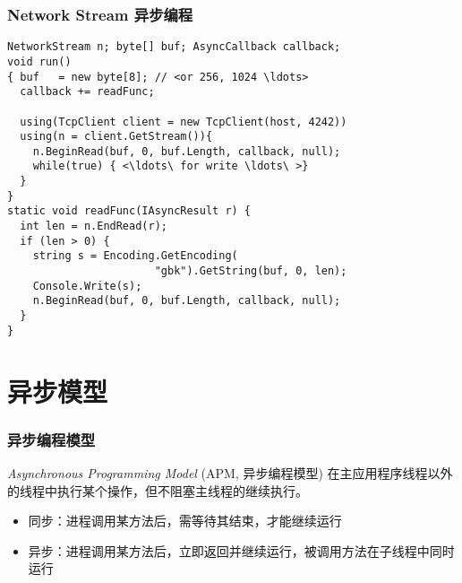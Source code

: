 
\begin{frame}[fragile]
\frametitle{Network Stream 异步编程}
\begin{lstlisting}[escapeinside=<>]
NetworkStream n; byte[] buf; AsyncCallback callback;
void run()
{ buf   = new byte[8]; // <or 256, 1024 \ldots>
  callback += readFunc; 

  using(TcpClient client = new TcpClient(host, 4242))
  using(n = client.GetStream()){
    n.BeginRead(buf, 0, buf.Length, callback, null);
    while(true) { <\ldots\ for write \ldots\ >}
  }
}
static void readFunc(IAsyncResult r) {
  int len = n.EndRead(r);
  if (len > 0) {
    string s = Encoding.GetEncoding(
                       "gbk").GetString(buf, 0, len);
    Console.Write(s);
    n.BeginRead(buf, 0, buf.Length, callback, null);
  }
}
\end{lstlisting}
\end{frame}

\section{异步模型}

\begin{frame}
\frametitle{异步编程模型}
\begin{block}{\textit{Asynchronous Programming Model} (APM, 异步编程模型)}
\CJKindent  在主应用程序线程以外的线程中执行某个操作，但不阻塞主线程的继续执行。
\end{block}

\begin{itemize}
\item 同步：进程调用某方法后，需等待其结束，才能继续运行
\item 异步：进程调用某方法后，立即返回并继续运行，被调用方法在子线程中同时运行
\end{itemize}


\end{frame}


